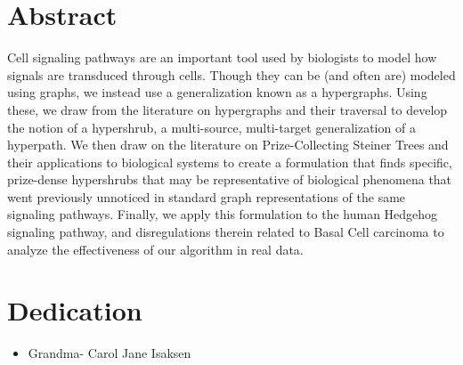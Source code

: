 \documentclass[12pt,twoside]{reedthesis}
\theoremstyle{definition}
\begin{document}
    \tableofcontents
    \listoftables
    \listoffigures

    \chapter*{Abstract}
	Cell signaling pathways are an important tool used by biologists to model how signals are transduced through cells. Though they can be (and often are) modeled using graphs, we instead use a generalization known as a hypergraphs. Using these, we draw from the literature on hypergraphs and their traversal to develop the notion of a hypershrub, a multi-source, multi-target generalization of a hyperpath. We then draw on the literature on Prize-Collecting Steiner Trees and their applications to biological systems to create a formulation that finds specific, prize-dense hypershrubs that may be representative of biological phenomena that went previously unnoticed in standard graph representations of the same signaling pathways. Finally, we apply this formulation to the human Hedgehog signaling pathway, and disregulations therein related to Basal Cell carcinoma to analyze the effectiveness of our algorithm in real data.

	\chapter*{Dedication}
	\begin{itemize}
    \item{Grandma- Carol Jane Isaksen}
  \end{itemize}
\end{document}
